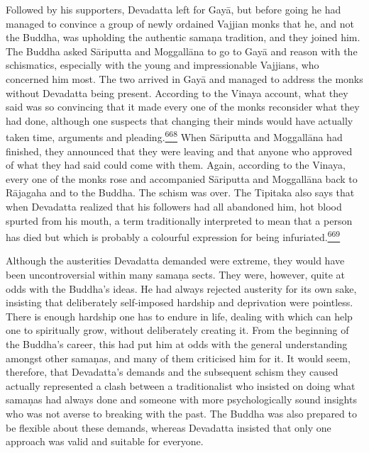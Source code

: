 Followed by his supporters, Devadatta left for Gayā, but before going he
had managed to convince a group of newly ordained Vajjian monks that he,
and not the Buddha, was upholding the authentic samaṇa tradition, and
they joined him. The Buddha asked Sāriputta and Moggallāna to go to Gayā
and reason with the schismatics, especially with the young and
impressionable Vajjians, who concerned him most. The two arrived in Gayā
and managed to address the monks without Devadatta being present.
According to the Vinaya account, what they said was so convincing that
it made every one of the monks reconsider what they had done, although
one suspects that changing their minds would have actually taken time,
arguments and
pleading.\label{footprints_split_016.html_fnref668}\hyperref[footprints_split_025.htmlux5cux23fn668]{\textsuperscript{668}}
When Sāriputta and Moggallāna had finished, they announced that they
were leaving and that anyone who approved of what they had said could
come with them. Again, according to the Vinaya, every one of the monks
rose and accompanied Sāriputta and Moggallāna back to Rājagaha and to
the Buddha. The schism was over. The Tipitaka also says that when
Devadatta realized that his followers had all abandoned him, hot blood
spurted from his mouth, a term traditionally interpreted to mean that a
person has died but which is probably a colourful expression for being
infuriated.\label{footprints_split_016.html_fnref669}\hyperref[footprints_split_025.htmlux5cux23fn669]{\textsuperscript{669}}

Although the austerities Devadatta demanded were extreme, they would
have been uncontroversial within many samaṇa sects. They were, however,
quite at odds with the Buddha's ideas. He had always rejected austerity
for its own sake, insisting that deliberately self-imposed hardship and
deprivation were pointless. There is enough hardship one has to endure
in life, dealing with which can help one to spiritually grow, without
deliberately creating it. From the beginning of the Buddha's career,
this had put him at odds with the general understanding amongst other
samaṇas, and many of them criticised him for it. It would seem,
therefore, that Devadatta's demands and the subsequent schism they
caused actually represented a clash between a traditionalist who
insisted on doing what samaṇas had always done and someone with more
psychologically sound insights who was not averse to breaking with the
past. The Buddha was also prepared to be flexible about these demands,
whereas Devadatta insisted that only one approach was valid and suitable
for everyone.

